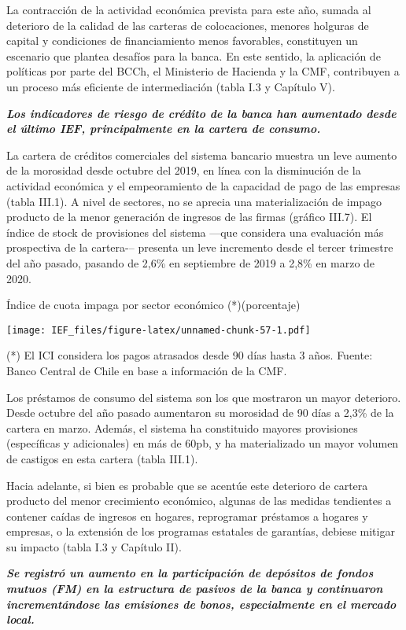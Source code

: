 \documentclass[
]{book}
\begin{document}
La contracción de la actividad económica prevista para este año, sumada al
deterioro de la calidad de las carteras de colocaciones, menores holguras de
capital y condiciones de financiamiento menos favorables, constituyen un
escenario que plantea desafíos para la banca. En este sentido, la aplicación de
políticas por parte del BCCh, el Ministerio de Hacienda y la CMF, contribuyen a
un proceso más eficiente de intermediación (tabla I.3 y Capítulo V).

\textbf{\emph{Los indicadores de riesgo de crédito de la banca han aumentado desde el último IEF, principalmente en la cartera de consumo.}}

La cartera de créditos comerciales del sistema bancario muestra un leve
aumento de la morosidad desde octubre del 2019, en línea con la disminución
de la actividad económica y el empeoramiento de la capacidad de pago de las
empresas (tabla III.1). A nivel de sectores, no se aprecia una materialización de
impago producto de la menor generación de ingresos de las firmas (gráfico
III.7). El índice de stock de provisiones del sistema ---que considera una
evaluación más prospectiva de la cartera-\/-- presenta un leve incremento desde
el tercer trimestre del año pasado, pasando de 2,6\% en septiembre de 2019 a
2,8\% en marzo de 2020.

Índice de cuota impaga por sector económico (*)(porcentaje)

\texttt{[image: IEF\_files/figure-latex/unnamed-chunk-57-1.pdf]}

(*) El ICI considera los pagos atrasados desde 90 días hasta 3 años.
Fuente: Banco Central de Chile en base a información de la CMF.

Los préstamos de consumo del sistema son los que mostraron un mayor
deterioro. Desde octubre del año pasado aumentaron su morosidad de 90 días
a 2,3\% de la cartera en marzo. Además, el sistema ha constituido mayores
provisiones (específicas y adicionales) en más de 60pb, y ha materializado un
mayor volumen de castigos en esta cartera (tabla III.1).

Hacia adelante, si bien es probable que se acentúe este deterioro de cartera
producto del menor crecimiento económico, algunas de las medidas tendientes
a contener caídas de ingresos en hogares, reprogramar préstamos a hogares
y empresas, o la extensión de los programas estatales de garantías, debiese
mitigar su impacto (tabla I.3 y Capítulo II).

\textbf{\emph{Se registró un aumento en la participación de depósitos de fondos mutuos (FM) en la estructura de pasivos de la banca y continuaron incrementándose las emisiones de bonos, especialmente en el mercado local.}}
\end{document}
